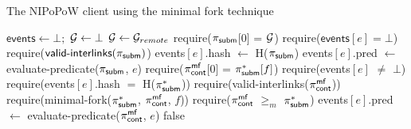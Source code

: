 \begin{algorithm}
    \caption{\label{alg:minimal-fork}The \textsf{NIPoPoW} client using the minimal fork technique}

    \begin{algorithmic}[1]

    \State $\textsf{events} \gets \bot;$ $\mathcal{G} \gets \bot$
        \State $\mathcal{G} \gets \mathcal{G}_{remote}$
    \EndFunction
        \State \textsf{require}($\mathsf{\pi_{subm}}$[0] = $\mathcal{G}$)
        \State \textsf{require}($\textsf{events$[e]$} = \bot$)
        \State \textsf{require}($\textsf{valid-interlinks}(\mathsf{\pi_{subm}})$)
        \State \textsf{events$[e]$.hash} $\gets$ \textsf{H}($\mathsf{\pi_{subm}}$)
        \State \textsf{events$[e]$.pred} $\gets$
        \textsf{evaluate-predicate}(\textsf{$\mathsf{\pi_{subm}}$}, $e$)
    \EndFunction
        \State \textsf{require}($\mathsf{\pi_{cont}^{mf}}$[0] = $\mathsf{\pi_{subm}^*}[f]$)
        \State \textsf{require}(\textsf{events}$[e]$ $\ne$ $\bot$)
        \State \textsf{require}(\textsf{events$[e]$.hash} $=$ \textsf{H}($\mathsf{\pi_{subm}^*}$))
        \State \textsf{require}(\textsf{valid-interlinks}($\mathsf{\pi_{cont}^{mf}}$))
        \State \textsf{require}(\textsf{minimal-fork}($\mathsf{\pi_{subm}^*}$,
        $\mathsf{\pi_{cont}^{mf}}$, $f$))
        \State \textsf{require}($\mathsf{\pi_{cont}^{mf}}$ $\geq_m$ $\mathsf{\pi_{subm}^*}$)
        \State \textsf{events$[e]$.pred} $\gets$
            \textsf{evaluate-predicate}($\mathsf{\pi_{cont}^{mf}}$, $e$)
    \EndFunction
                \State\Return false
            \EndIf
        \EndFor
    \EndFunction
    \EndContract
    \vskip8pt
    \end{algorithmic}
\end{algorithm}

